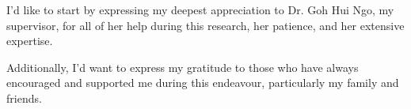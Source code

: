 I'd like to start by expressing my deepest appreciation to Dr. Goh Hui Ngo, my supervisor, for all of her help during this research, her patience, and her extensive expertise.

Additionally, I'd want to express my gratitude to those who have always encouraged and supported me during this endeavour, particularly my family and friends. 